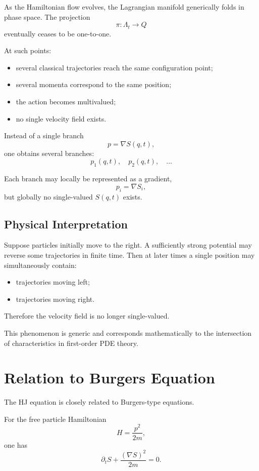 \documentclass[11pt]{article}
\begin{document}
As the Hamiltonian flow evolves, the Lagrangian manifold generically folds in phase space. The projection
\[
\pi:\Lambda_t\to Q
\]
eventually ceases to be one-to-one.

At such points:
\begin{itemize}
\item several classical trajectories reach the same configuration point;
\item several momenta correspond to the same position;
\item the action becomes multivalued;
\item no single velocity field exists.
\end{itemize}

Instead of a single branch
\[
p=\nabla S(q,t),
\]
one obtains several branches:
\begin{equation}
p_1(q,t),\quad p_2(q,t),\quad \dots
\end{equation}

Each branch may locally be represented as a gradient,
\[
p_i=\nabla S_i,
\]
but globally no single-valued $S(q,t)$ exists.

\subsection{Physical Interpretation}

Suppose particles initially move to the right. A sufficiently strong potential may reverse some trajectories in finite time. Then at later times a single position may simultaneously contain:
\begin{itemize}
\item trajectories moving left;
\item trajectories moving right.
\end{itemize}

Therefore the velocity field is no longer single-valued.

This phenomenon is generic and corresponds mathematically to the intersection of characteristics in first-order PDE theory.

\section{Relation to Burgers Equation}

The HJ equation is closely related to Burgers-type equations.

For the free particle Hamiltonian
\[
H=\frac{p^2}{2m},
\]
one has
\begin{equation}
\partial_t S + \frac{(\nabla S)^2}{2m}=0.
\end{equation}
\end{document}
